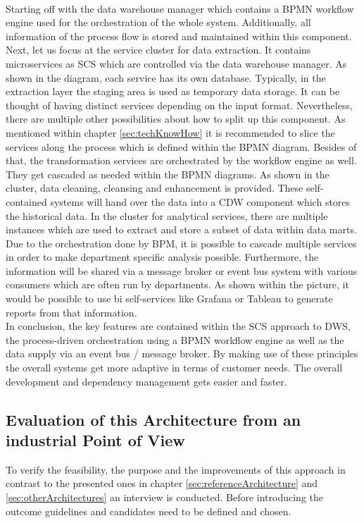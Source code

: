 \\
Starting off with the data warehouse manager which contains a BPMN workflow engine used for the orchestration of the whole system. Additionally, all information of the process flow is stored and maintained within this component. \newline
Next, let us focus at the service cluster for data extraction. It contains microservices as SCS which are controlled via the data warehouse manager. As shown in the diagram, each service has its own database. Typically, in the extraction layer the staging area is used as temporary data storage.  It can be thought of having distinct services depending on the input format. Nevertheless, there are multiple other possibilities about how to split up this component. As mentioned within chapter \ref{sec:techKnowHow} it is recommended to slice the services along the process which is defined within the BPMN diagram.\newline
Besides of that, the transformation services are orchestrated by the workflow engine as well. They get cascaded as needed within the BPMN diagrams. As shown in the cluster, data cleaning, cleansing and enhancement is provided. These self-contained systems will hand over the data into a CDW component which stores the historical data.\newline
In the cluster for analytical services, there are multiple instances which are used to extract and store a subset of data within data marts. Due to the orchestration done by BPM, it is possible to cascade multiple services in order to make department specific analysis possible. Furthermore, the information will be shared via a message broker or event bus system with various consumers which are often run by departments. As shown within the picture, it would be possible to use \acrshort{bi} self-services like Grafana or Tableau to generate reports from that information.\newline
\\
In conclusion, the key features are contained within the SCS approach to DWS, the process-driven orchestration using a BPMN workflow engine as well as the data supply via an event bus / message broker. By making use of these principles the overall systems get more adaptive in terms of customer needs. The overall development and dependency management gets easier and faster. 

\subsection{Evaluation of this Architecture from an industrial Point of View}
To verify the feasibility, the purpose and the improvements of this approach in contrast to the presented ones in chapter \ref{sec:referenceArchitecture} and \ref{sec:otherArchitectures} an interview is conducted. Before introducing the outcome guidelines and candidates need to be defined and chosen.


